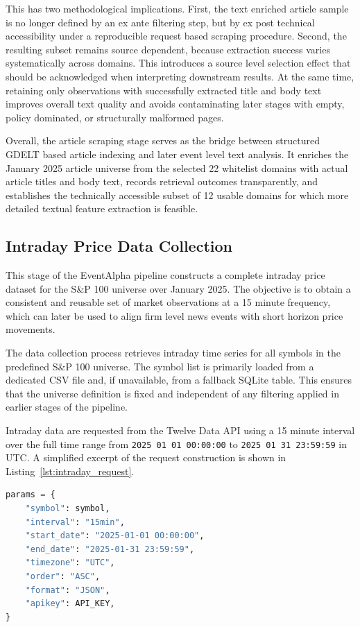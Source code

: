 This has two methodological implications. First, the text enriched article sample is no longer defined by an ex ante filtering step, but by ex post technical accessibility under a reproducible request based scraping procedure. Second, the resulting subset remains source dependent, because extraction success varies systematically across domains. This introduces a source level selection effect that should be acknowledged when interpreting downstream results. At the same time, retaining only observations with successfully extracted title and body text improves overall text quality and avoids contaminating later stages with empty, policy dominated, or structurally malformed pages.

Overall, the article scraping stage serves as the bridge between structured GDELT based article indexing and later event level text analysis. It enriches the January 2025 article universe from the selected 22 whitelist domains with actual article titles and body text, records retrieval outcomes transparently, and establishes the technically accessible subset of 12 usable domains for which more detailed textual feature extraction is feasible.

\subsection{Intraday Price Data Collection}

This stage of the EventAlpha pipeline constructs a complete intraday price dataset for the S\&P 100 universe over January 2025. The objective is to obtain a consistent and reusable set of market observations at a 15 minute frequency, which can later be used to align firm level news events with short horizon price movements.

The data collection process retrieves intraday time series for all symbols in the predefined S\&P 100 universe. The symbol list is primarily loaded from a dedicated CSV file and, if unavailable, from a fallback SQLite table. This ensures that the universe definition is fixed and independent of any filtering applied in earlier stages of the pipeline.

Intraday data are requested from the Twelve Data API using a 15 minute interval over the full time range from \texttt{2025 01 01 00:00:00} to \texttt{2025 01 31 23:59:59} in UTC. A simplified excerpt of the request construction is shown in Listing~\ref{lst:intraday_request}.

\begin{lstlisting}[language=Python, caption={Requesting 15 minute intraday bars from Twelve Data}, label={lst:intraday_request}]
params = {
    "symbol": symbol,
    "interval": "15min",
    "start_date": "2025-01-01 00:00:00",
    "end_date": "2025-01-31 23:59:59",
    "timezone": "UTC",
    "order": "ASC",
    "format": "JSON",
    "apikey": API_KEY,
}
\end{lstlisting}

